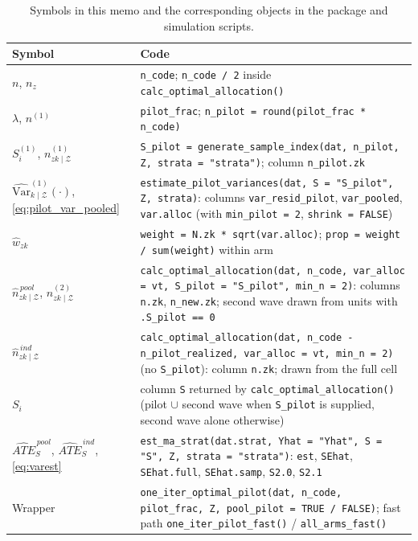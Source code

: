 \documentclass[12pt]{article}
\theoremstyle{remark}
\def\Var{\mbox{Var}}
\newcommand{\varkZpil}[1]{\widehat{\Var}^{(1)}_{k \mid \mathcal{Z}} \! \left ( #1 \right )}
\newcommand{\npzkZ}{n^{(1)}_{zk \mid \mathcal{Z}}}
\newcommand{\nszkZ}{n^{(2)}_{zk \mid \mathcal{Z}}}
\newcommand{\npoolzkZ}{\hat{n}^{\,pool}_{zk \mid \mathcal{Z}}}
\newcommand{\nindzkZ}{\hat{n}^{\,ind}_{zk \mid \mathcal{Z}}}
\newcommand{\atepool}{\widehat{ATE}_S^{\,pool}}
\newcommand{\ateind}{\widehat{ATE}_S^{\,ind}}
\newcommand{\code}[1]{\texttt{#1}}
\begin{document}
\begin{table}[H]
\centering
\small
\renewcommand{\arraystretch}{1.2}
\begin{tabular}{@{}L{4.2cm}L{10.6cm}@{}}
\toprule
\textbf{Symbol} & \textbf{Code} \\
\midrule
$n$, $n_z$ & \code{n\_code}; \code{n\_code / 2} inside \code{calc\_optimal\_allocation()} \\
$\lambda$, $n^{(1)}$ & \code{pilot\_frac}; \code{n\_pilot = round(pilot\_frac * n\_code)} \\
$S^{(1)}_i$, $\npzkZ$ & \code{S\_pilot = generate\_sample\_index(dat, n\_pilot, Z, strata = "strata")}; column \code{n\_pilot.zk} \\
$\varkZpil{\cdot}$, \eqref{eq:pilot_var_pooled} & \code{estimate\_pilot\_variances(dat, S = "S\_pilot", Z, strata)}: columns \code{var\_resid\_pilot}, \code{var\_pooled}, \code{var.alloc} (with \code{min\_pilot = 2}, \code{shrink = FALSE}) \\
$\hat{w}_{zk}$ & \code{weight = N.zk * sqrt(var.alloc)}; \code{prop = weight / sum(weight)} within arm \\
$\npoolzkZ$, $\nszkZ$ & \code{calc\_optimal\_allocation(dat, n\_code, var\_alloc = vt, S\_pilot = "S\_pilot", min\_n = 2)}: columns \code{n.zk}, \code{n\_new.zk}; second wave drawn from units with \code{.S\_pilot == 0} \\
$\nindzkZ$ & \code{calc\_optimal\_allocation(dat, n\_code - n\_pilot\_realized, var\_alloc = vt, min\_n = 2)} (no \code{S\_pilot}): column \code{n.zk}; drawn from the full cell \\
$S_i$ & column \code{S} returned by \code{calc\_optimal\_allocation()} (pilot $\cup$ second wave when \code{S\_pilot} is supplied, second wave alone otherwise) \\
$\atepool$, $\ateind$, \eqref{eq:varest} & \code{est\_ma\_strat(dat.strat, Yhat = "Yhat", S = "S", Z, strata = "strata")}: \code{est}, \code{SEhat}, \code{SEhat.full}, \code{SEhat.samp}, \code{S2.0}, \code{S2.1} \\
Wrapper & \code{one\_iter\_optimal\_pilot(dat, n\_code, pilot\_frac, Z, pool\_pilot = TRUE / FALSE)}; fast path \code{one\_iter\_pilot\_fast()} / \code{all\_arms\_fast()} \\
\bottomrule
\end{tabular}
\caption{Symbols in this memo and the corresponding objects in the package and simulation scripts.}
\label{tab:code}
\end{table}
\end{document}
